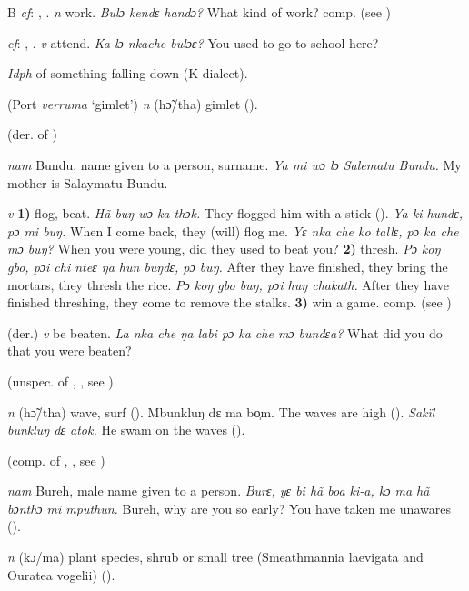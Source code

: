 \begin{letter}{B}
 \textit{cf}: , . \textit{n} work. \textit{Bulɔ kendɛ handɔ?} What kind of work? comp.  (see )

 \textit{cf}: , . \textit{v} attend. \textit{Ka lɔ nkache bulɔɛ?} You used to go to school here?

 \textit{Idph} of something falling down (K dialect).

 (Port \textit{verruma} ‘gimlet') \textit{n} (hɔ̃/tha) gimlet (\citealt{Pichl1967}). 

 (der. of ) 

 \textit{nam} Bundu, name given to a person, surname. \textit{Ya mi wɔ lɔ Salematu Bundu.} My mother is Salaymatu Bundu.

 \textit{v} \textbf{1)} flog, beat. \textit{Hã buŋ wɔ ka thɔk.} They flogged him with a stick (\citealt{Pichl1967}). \textit{Ya ki hundɛ, pɔ mi buŋ.} When I come back, they (will) flog me. \textit{Yɛ nka che ko tallɛ, pɔ ka che mɔ buŋ?} When you were young, did they used to beat you? \textbf{2)} thresh. \textit{Pɔ koŋ gbo, pɔi chi nteɛ ŋa hun buŋdɛ, pɔ buŋ.} After they have finished, they bring the mortars, they thresh the rice. \textit{Pɔ koŋ gbo buŋ, pɔi huŋ chakath.} After they have finished threshing, they come to remove the stalks. \textbf{3)} win a game. comp.  (see ) 

 (der.) \textit{v} be beaten. \textit{La nka che ŋa labi pɔ ka che mɔ bundɛa?} What did you do that you were beaten?

 (unspec. of , , see ) 

 \textit{n} (hɔ̃/tha) wave, surf (\citealt{Pichl1967}). Mbunkluŋ dɛ ma bo̹m. The waves are high (\citealt{Pichl1967}). \textit{Sakïl bunkluŋ dɛ atok.} He swam on the waves (\citealt{Pichl1967}). 

 (comp. of , , see ) 

 \textit{nam} Bureh, male name given to a person. \textit{Burɛ, yɛ bi hã boa ki-a, kɔ ma hã bɔnthɔ mi mputhun.} Bureh, why are you so early? You have taken me unawares (\citealt{Pichl1967}). 

 \textit{n} (kɔ/ma) plant species, shrub or small tree (Smeathmannia laevigata and Ouratea vogelii) (\citealt{Pichl1967}). 


\end{letter}
